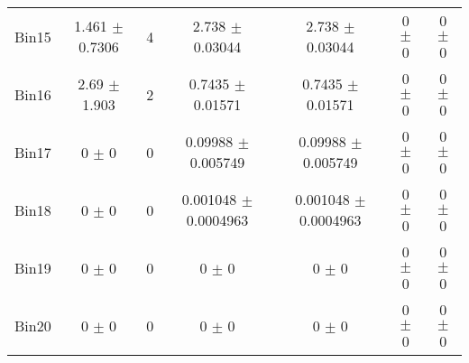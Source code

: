 \begin{tabular}{@{\extracolsep{4pt}}lcccccc@{}}
     Bin15 & 1.461 $\pm$ 0.7306 & 4 & 2.738 $\pm$ 0.03044 & 2.738 $\pm$ 0.03044 & 0 $\pm$ 0 & 0 $\pm$ 0 \\ 
     Bin16 & 2.69 $\pm$ 1.903 & 2 & 0.7435 $\pm$ 0.01571 & 0.7435 $\pm$ 0.01571 & 0 $\pm$ 0 & 0 $\pm$ 0 \\ 
     Bin17 & 0 $\pm$ 0 & 0 & 0.09988 $\pm$ 0.005749 & 0.09988 $\pm$ 0.005749 & 0 $\pm$ 0 & 0 $\pm$ 0 \\ 
     Bin18 & 0 $\pm$ 0 & 0 & 0.001048 $\pm$ 0.0004963 & 0.001048 $\pm$ 0.0004963 & 0 $\pm$ 0 & 0 $\pm$ 0 \\ 
     Bin19 & 0 $\pm$ 0 & 0 & 0 $\pm$ 0 & 0 $\pm$ 0 & 0 $\pm$ 0 & 0 $\pm$ 0 \\ 
     Bin20 & 0 $\pm$ 0 & 0 & 0 $\pm$ 0 & 0 $\pm$ 0 & 0 $\pm$ 0 & 0 $\pm$ 0 \\ 
\hline\hline
  \end{tabular}
